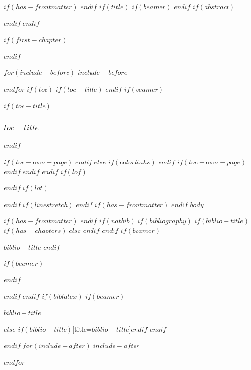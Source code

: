 \documentclass[
$if(fontsize)$
  $fontsize$,
$endif$
$if(papersize)$
  $papersize$paper,
$else$
  paper=a4,
$endif$
$if(beamer)$
  ignorenonframetext,
$if(handout)$
  handout,
$endif$
$if(aspectratio)$
  aspectratio=$aspectratio$,
$endif$
$endif$
$for(classoption)$
  $classoption$$sep$,
$endfor$
  ,captions=tableheading
]{$if(beamer)$$documentclass$$else$$if(book)$scrbook$else$scrartcl$endif$$endif$}
\newif\ifbibliography
\newcounter{none}
\begin{document}

$if(has-frontmatter)$
\frontmatter
$endif$
$if(title)$
$if(beamer)$
\frame{\titlepage}
$endif$
$if(abstract)$
\begin{abstract}
$abstract$
\end{abstract}
$endif$
$endif$

$if(first-chapter)$
\setcounter{chapter}{$first-chapter$}
\addtocounter{chapter}{-1}
$endif$

$for(include-before)$
$include-before$

$endfor$
$if(toc)$
$if(toc-title)$
\renewcommand*\contentsname{$toc-title$}
$endif$
$if(beamer)$
\begin{frame}[allowframebreaks]
$if(toc-title)$
  \frametitle{$toc-title$}
$endif$
  \tableofcontents[hideallsubsections]
\end{frame}
$if(toc-own-page)$
\newpage
$endif$
$else$
{
$if(colorlinks)$
\hypersetup{linkcolor=$if(toccolor)$$toccolor$$else$$endif$}
$endif$
\setcounter{tocdepth}{$toc-depth$}
\tableofcontents
$if(toc-own-page)$
\newpage
$endif$
}
$endif$
$endif$
$if(lof)$
\listoffigures
$endif$
$if(lot)$
\listoftables
$endif$
$if(linestretch)$
$endif$
$if(has-frontmatter)$
\mainmatter
$endif$
$body$

$if(has-frontmatter)$
\backmatter
$endif$
$if(natbib)$
$if(bibliography)$
$if(biblio-title)$
$if(has-chapters)$
\renewcommand\bibname{$biblio-title$}
$else$
\renewcommand\refname{$biblio-title$}
$endif$
$endif$
$if(beamer)$
\begin{frame}[allowframebreaks]{$biblio-title$}
  \bibliographytrue
$endif$
  
$if(beamer)$
\end{frame}
$endif$

$endif$
$endif$
$if(biblatex)$
$if(beamer)$
\begin{frame}[allowframebreaks]{$biblio-title$}
  \bibliographytrue
  \printbibliography[heading=none]
\end{frame}
$else$
\printbibliography$if(biblio-title)$[title=$biblio-title$]$endif$
$endif$

$endif$
$for(include-after)$
$include-after$

$endfor$
\end{document}
